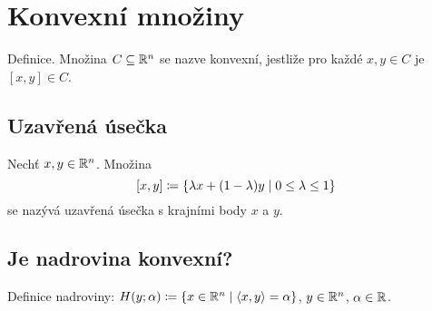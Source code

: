 

\newpage
\section*{Konvexní množiny} \label{sec:konvex}
Definice. Množina $C \subseteq \mathbb{R}^n$ se nazve konvexní, jestliže pro každé $x, y \in C$ je $[x,y] \in C$.

\subsection{Uzavřená úsečka}
Nechť $x, y \in \mathbb{R}^n$. Množina
\[ [x,y] \coloneq \left\lbrace \lambda x + (1-\lambda)y \mid 0 \leq \lambda \leq 1 \right\rbrace \]
se nazývá uzavřená úsečka s krajními body $x$ a $y$.

\subsection{Je nadrovina konvexní?}
Definice nadroviny: $H(y; \alpha) \coloneq \left\lbrace x \in \mathbb{R}^n \mid \langle x, y \rangle = \alpha \right\rbrace$, $y \in \mathbb{R}^n$, $\alpha \in \mathbb{R}$.

